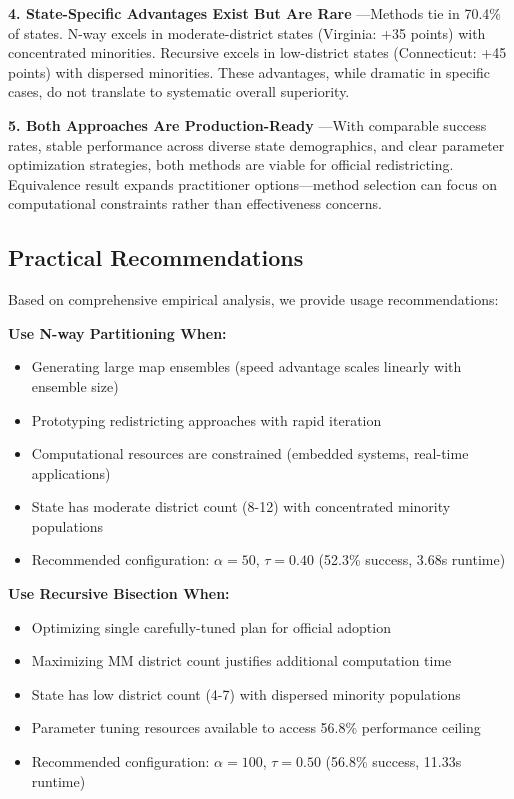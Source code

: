 \textbf{4. State-Specific Advantages Exist But Are Rare} —Methods tie in 70.4\% of states. N-way excels in moderate-district states (Virginia: +35 points) with concentrated minorities. Recursive excels in low-district states (Connecticut: +45 points) with dispersed minorities. These advantages, while dramatic in specific cases, do not translate to systematic overall superiority.

\textbf{5. Both Approaches Are Production-Ready} —With comparable success rates, stable performance across diverse state demographics, and clear parameter optimization strategies, both methods are viable for official redistricting. Equivalence result expands practitioner options—method selection can focus on computational constraints rather than effectiveness concerns.

\subsection{Practical Recommendations}

Based on comprehensive empirical analysis, we provide usage recommendations:

\textbf{Use N-way Partitioning When:}
\begin{itemize}
\item Generating large map ensembles (speed advantage scales linearly with ensemble size)
\item Prototyping redistricting approaches with rapid iteration
\item Computational resources are constrained (embedded systems, real-time applications)
\item State has moderate district count (8-12) with concentrated minority populations
\item Recommended configuration: $\alpha=50$, $\tau=0.40$ (52.3\% success, 3.68s runtime)
\end{itemize}

\textbf{Use Recursive Bisection When:}
\begin{itemize}
\item Optimizing single carefully-tuned plan for official adoption
\item Maximizing MM district count justifies additional computation time
\item State has low district count (4-7) with dispersed minority populations
\item Parameter tuning resources available to access 56.8\% performance ceiling
\item Recommended configuration: $\alpha=100$, $\tau=0.50$ (56.8\% success, 11.33s runtime)
\end{itemize}

